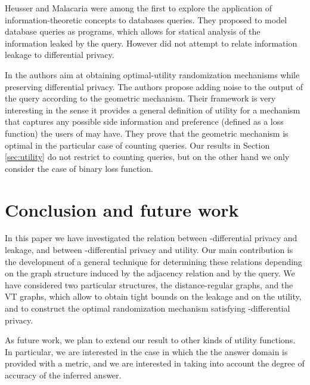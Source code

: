 \documentclass{llncs}
\begin{document}
Heusser and Malacaria \cite{Heusser:09:FAST} were among the first to explore the application of information-theoretic concepts to databases queries. They proposed to model database queries as programs, which allows for statical analysis of the information leaked by the query.  However  \cite{Heusser:09:FAST}  did not attempt to relate information leakage to differential privacy.

In \cite{Ghosh:09:STC} the authors aim at obtaining optimal-utility randomization mechanisms while preserving differential privacy. The authors propose adding noise to the output of the query according to the geometric mechanism. Their framework is very interesting in the sense it provides a general definition of utility for a mechanism  that captures any possible side information and preference (defined as a loss function) the users of  may have. They prove that the geometric mechanism is optimal in the particular case of counting queries. Our results in Section \ref{sec:utility} do not restrict to counting queries, but on the other hand we only consider the case of binary loss function.


\section{Conclusion and future work}
In this paper we have investigated the relation between -differential privacy and leakage, and between -differential privacy and utility.
 Our main contribution is the development of a general technique for determining these relations  depending on the graph structure induced by the adjacency relation and by the query.
 We have considered two particular structures, the distance-regular graphs, and the VT graphs, which allow to obtain tight bounds on the leakage and on the utility, and to construct the optimal randomization mechanism satisfying -differential privacy. 
 

As future work, we plan to extend our result to other kinds of utility functions. In particular, we are interested in the case in which the the answer domain is provided with a metric, and we are interested in taking into account  the degree of accuracy of the inferred answer.  



\end{document}
